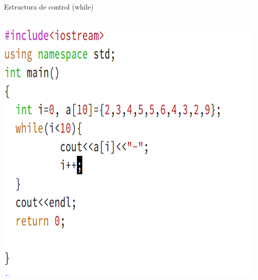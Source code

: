 \documentclass[presentation, aspectratio=54]{beamer}
\begin{document}
\begin{frame}[label={sec:orgfe21858}]{Estructura de control (while)}
\begin{columns}
\begin{column}{0.6\columnwidth}
\begin{center}
\includegraphics[width=.9\linewidth]{./images/codigo/code-while.png}
\end{center}
\end{column}
\end{columns}
\end{frame}
\end{document}
